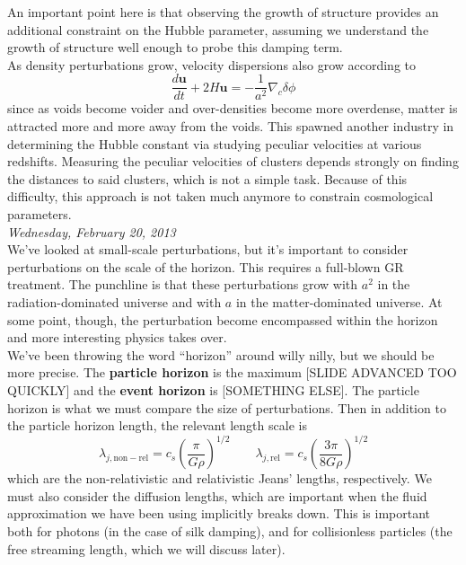 \documentclass[10pt]{article}
\numberwithin{equation}{section}
\newcommand{\n}{\noindent}
\begin{document}
	\n An important point here is that observing the growth of structure provides an additional constraint on the Hubble parameter, assuming we understand the growth of structure well enough to probe this damping term.\\
	
	\n As density perturbations grow, velocity dispersions also grow according to
	\begin{equation}
		\label{eq:struc5} \frac{d\mathbf{u}}{dt} + 2H\mathbf{u} = -\frac{1}{a^2}\nabla_c\delta\phi
	\end{equation}
	since as voids become voider and over-densities become more overdense, matter is attracted more and more away from the voids. This spawned another industry in determining the Hubble constant via studying peculiar velocities at various redshifts. Measuring the peculiar velocities of clusters depends strongly on finding the distances to said clusters, which is not a simple task. Because of this difficulty, this approach is not taken much anymore to constrain cosmological parameters.\\
	
	\n\textit{Wednesday, February 20, 2013}\\
	
	\n We've looked at small-scale perturbations, but it's important to consider perturbations on the scale of the horizon. This requires a full-blown GR treatment. The punchline is that these perturbations grow with $a^2$ in the radiation-dominated universe and with $a$ in the matter-dominated universe. At some point, though, the perturbation become encompassed within the horizon and more interesting physics takes over.\\
	
	\n We've been throwing the word ``horizon'' around willy nilly, but we should be more precise. The \textbf{particle horizon} is the maximum [SLIDE ADVANCED TOO QUICKLY] and the \textbf{event horizon} is [SOMETHING ELSE]. The particle horizon is what we must compare the size of perturbations. Then in addition to the particle horizon length, the relevant length scale is
	\begin{equation}
		\label{eq:struc6} \lambda_{j,\mathrm{non-rel}} = c_s\left(\frac{\pi}{G\rho}\right)^{1/2} \qquad \lambda_{j,\mathrm{rel}}=c_s\left(\frac{3\pi}{8G\rho}\right)^{1/2}
	\end{equation}
	which are the non-relativistic and relativistic Jeans' lengths, respectively. We must also consider the diffusion lengths, which are important when the fluid approximation we have been using implicitly breaks down. This is important both for photons (in the case of silk damping), and for collisionless particles (the free streaming length, which we will discuss later).\\
	
\end{document}
